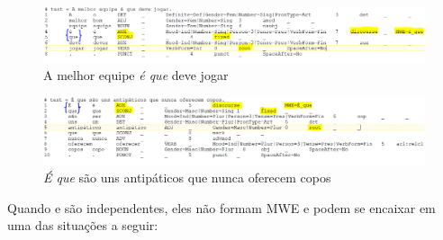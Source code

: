 \documentclass[output=paper,colorlinks,citecolor=brown]{langscibook}
\begin{document}
		\begin{figure}
    	\centering
    	\includegraphics[width=\textwidth,height=\textheight,keepaspectratio]{imagesDrive/image16.png}
    	\caption{A melhor equipe \emph{é que} deve jogar}
    	\label{fig:equeMWE2}
    	\end{figure}{}

	\begin{figure}
    	\centering
    	\includegraphics[width=\textwidth,height=\textheight,keepaspectratio]{imagesDrive/image71.PNG}
    	\caption{\emph{É que} são uns antipáticos que nunca oferecem copos}
    	\label{fig:equeMWE3}
    	\end{figure}{}

	Quando  e  são independentes, eles não formam MWE e podem se encaixar em uma das situações a seguir:
\end{document}
